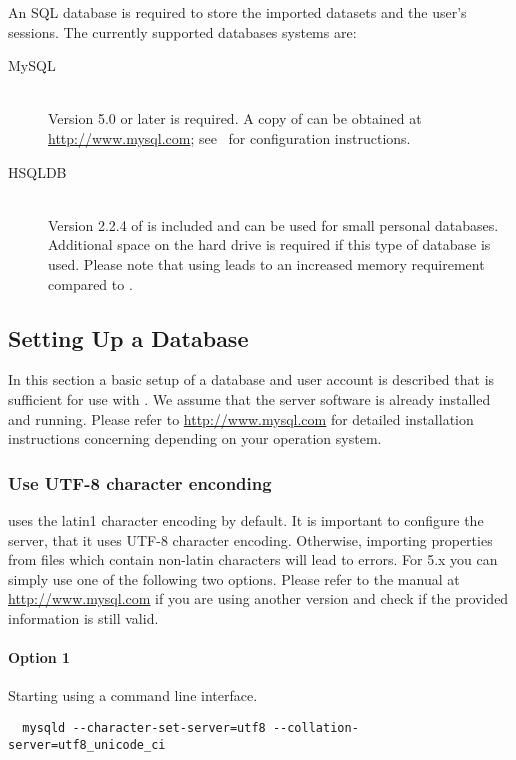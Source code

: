 An SQL database is required to store the imported datasets and the user's sessions.
The currently supported databases systems are:
\begin{description}
	\item[MySQL]  \hfill \\ Version 5.0 or later is required. A copy of \mysql can be obtained at \mbox{\url{http://www.mysql.com}}; see~ for configuration instructions.
	\item[HSQLDB] \hfill \\ Version 2.2.4 of \hsqldb is included and can be used for small personal databases. Additional space on the hard drive is required if this type of database is used. Please note that using \hsqldb leads to an increased memory requirement compared to \mysql.
\end{description}

\subsection{Setting Up a \mysql Database}\label{sec:scaffoldhunter:requirements:database}
In this section a basic setup of a \mysql database and user account is described that is sufficient for use with \sh. We assume that the server software is already installed and running. Please refer to \url{http://www.mysql.com} for detailed installation instructions concerning \mysql depending on your operation system.

\subsubsection{Use UTF-8 character enconding}
\mysql uses the latin1 character encoding by default. It is important to configure the \mysql server, that it uses UTF-8 character encoding. Otherwise, importing properties from files which contain non-latin characters will lead to errors. For \mysql 5.x you can simply use one of the following two options. Please refer to the \mysql manual at \url{http://www.mysql.com} if you are using another version and check if the provided information is still valid.

\paragraph{Option 1} Starting \mysql using a command line interface.
\begin{verbatim}
  mysqld --character-set-server=utf8 --collation-server=utf8_unicode_ci
\end{verbatim}

